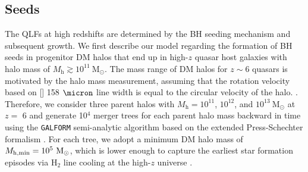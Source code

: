 \documentclass[twocolumn, twocolappendix]{aastex63}
\newcommand{\Msun}{\mathrm{M_\odot}}
\newcommand{\Mh}{M_\mathrm{h}}
\begin{document}
\begin{CJK*}{UTF8}{gbsn}
\subsection{Seeds}\label{sec:seed}
The QLFs at high redshifts are determined by the BH seeding mechanism and subsequent growth. 
We first describe our model regarding the formation of BH seeds in progenitor DM halos 
that end up in high-$z$ quasar host galaxies with halo mass of $\Mh \gtrsim 10^{11}~\Msun$.
The mass range of DM halos for $z\sim 6$ quasars is motivated by the halo mass measurement, 
assuming that the rotation velocity based on [] 158 $\micron$ line width is equal to the circular velocity of the halo.
\citep{2002ApJ...578...90F,2013ApJ...773...44W,2019ApJ...872L..29S}.
Therefore, we consider three parent halos with $\Mh = 10^{11}$, $10^{12}$, and $10^{13} ~\Msun$ at $z=$ 6
and generate 10$^4$ merger trees for each parent halo mass backward in time using the {\tt GALFORM} 
semi-analytic algorithm based on the extended Press-Schechter formalism 
\citep{1974ApJ...187..425P,2000MNRAS.319..168C,2008MNRAS.383..557P}.
For each tree, we adopt a minimum DM halo mass of $M_{\rm h,min}=10^5~\Msun$, which is lower enough to capture 
the earliest star formation episodes via H$_2$ line cooling at the high-$z$ universe \citep{1996ApJ...464..523H,1997ApJ...474....1T}.



\end{CJK*}
\end{document}
